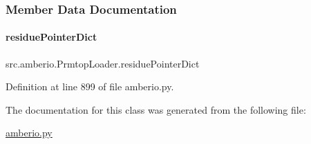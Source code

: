 \subsubsection{Member Data Documentation}
\mbox{\label{classsrc_1_1amberio_1_1PrmtopLoader_a3bfd794a547cf87923949354cd07c844}} 
\paragraph{\texorpdfstring{residue\+Pointer\+Dict}{residuePointerDict}}
{\footnotesize\ttfamily src.\+amberio.\+Prmtop\+Loader.\+residue\+Pointer\+Dict}



Definition at line 899 of file amberio.\+py.



The documentation for this class was generated from the following file\+:\begin{DoxyCompactItemize}
\item 
\hyperlink{amberio_8py}{amberio.\+py}\end{DoxyCompactItemize}
